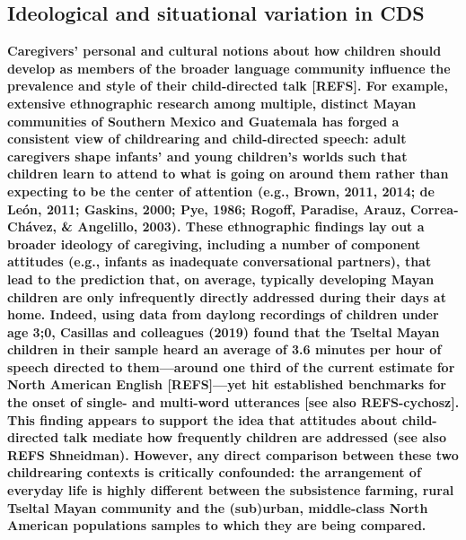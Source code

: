 \documentclass[,man,floatsintext]{apa6}
\begin{document}
\subsection{Ideological and situational variation in
CDS}\label{ideological-and-situational-variation-in-cds}

\textbf{Caregivers' personal and cultural notions about how children
should develop as members of the broader language community influence
the prevalence and style of their child-directed talk {[}REFS{]}. For
example, extensive ethnographic research among multiple, distinct Mayan
communities of Southern Mexico and Guatemala has forged a consistent
view of childrearing and child-directed speech: adult caregivers shape
infants' and young children's worlds such that children learn to attend
to what is going on around them rather than expecting to be the center
of attention (e.g., Brown, 2011, 2014; de León, 2011; Gaskins, 2000;
Pye, 1986; Rogoff, Paradise, Arauz, Correa-Chávez, \& Angelillo, 2003).
These ethnographic findings lay out a broader ideology of caregiving,
including a number of component attitudes (e.g., infants as inadequate
conversational partners), that lead to the prediction that, on average,
typically developing Mayan children are only infrequently directly
addressed during their days at home. Indeed, using data from daylong
recordings of children under age 3;0, Casillas and colleagues (2019)
found that the Tseltal Mayan children in their sample heard an average
of 3.6 minutes per hour of speech directed to them---around one third of
the current estimate for North American English {[}REFS{]}---yet hit
established benchmarks for the onset of single- and multi-word
utterances {[}see also REFS-cychosz{]}. This finding appears to support
the idea that attitudes about child-directed talk mediate how frequently
children are addressed (see also REFS Shneidman). However, any direct
comparison between these two childrearing contexts is critically
confounded: the arrangement of everyday life is highly different between
the subsistence farming, rural Tseltal Mayan community and the
(sub)urban, middle-class North American populations samples to which
they are being compared.}
\end{document}
